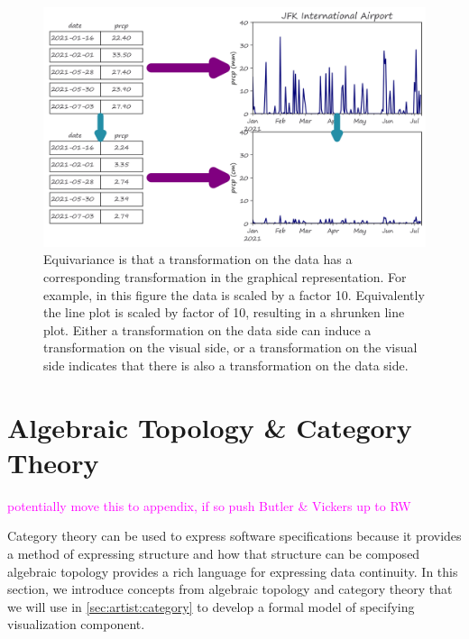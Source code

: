 \documentclass[10pt,journal,compsoc]{IEEEtran}
\newcommand{\note}[1]{\textcolor{magenta}{#1}}
\theoremstyle{definition}
\theoremstyle{remark}
\begin{document}
\begin{figure}[h!]
  \label{fig:related-work:equivariance}
  \includegraphics[width=\columnwidth]{equiv.png}
  \caption{Equivariance is that a transformation on the data has a corresponding transformation in the graphical representation. For example, in this figure the data is scaled by a factor 10. Equivalently the line plot is scaled by factor of 10, resulting in a shrunken line plot. Either a transformation on the data side can induce a transformation on the visual side, or a transformation on the visual side indicates that there is also a transformation on the data side. }
\end{figure}

\section{Algebraic Topology \& Category Theory}
\note{potentially move this to appendix, if so push Butler & Vickers up to RW}

Category theory can be used to express software specifications because it provides a method of expressing structure and how that structure can be composed \cite{wielsManagementEvolvingSpecifications1998} algebraic topology provides a rich language for expressing data continuity. In this section, we introduce concepts from algebraic topology and category theory that we will use in \autoref{sec:artist:category} to develop a formal model of specifying visualization component.
\end{document}
